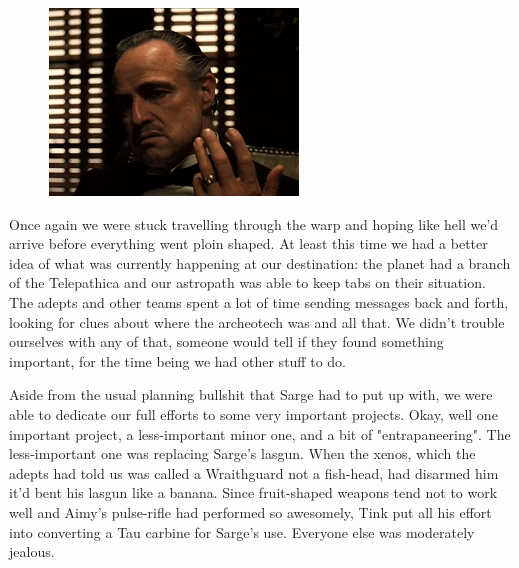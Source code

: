 \begin{figure}
	\begin{center}
		\includegraphics[width=\figwidth]{pics/11/67.png}
	\end{center}
\end{figure}
Once again we were stuck travelling through the warp and hoping like hell we'd arrive before everything went ploin shaped. 
At least this time we had a better idea of what was currently happening at our destination: 
the planet had a branch of the Telepathica and our astropath was able to keep tabs on their situation. 
The adepts and other teams spent a lot of time sending messages back and forth, looking for clues about where the archeotech was and all that. 
We didn't trouble ourselves with any of that, someone would tell if they found something important, for the time being we had other stuff to do.

Aside from the usual planning bullshit that Sarge had to put up with, we were able to dedicate our full efforts to some very important projects. 
Okay, well one important project, a less-important minor one, and a bit of "entrapaneering". 
The less-important one was replacing Sarge's lasgun. 
When the xenos, which the adepts had told us was called a Wraithguard not a fish-head, had disarmed him it'd bent his lasgun like a banana. 
Since fruit-shaped weapons tend not to work well and Aimy's pulse-rifle had performed so awesomely, Tink put all his effort into converting a Tau carbine for Sarge's use. 
Everyone else was moderately jealous.

